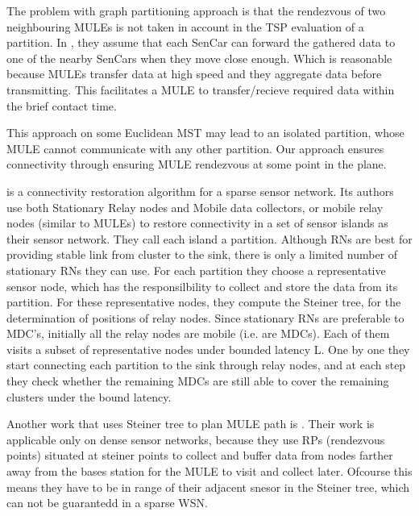 The problem with graph partitioning approach is that the rendezvous of two neighbouring MULEs is not taken in account in the TSP evaluation of a partition. In \cite{sim4}, they assume that each SenCar can forward the gathered data to one of the nearby SenCars when they move close enough. Which is reasonable because MULEs transfer data at high speed and they aggregate data before transmitting. This facilitates a MULE to transfer/recieve required data within the brief contact time.

This approach on some Euclidean MST may lead to an isolated partition, whose MULE cannot communicate with any other partition. Our approach ensures connectivity through ensuring MULE rendezvous at some point in the plane.

\cite{sim3} is a connectivity restoration algorithm for a sparse sensor network. Its authors use both Stationary Relay nodes and Mobile data collectors, or mobile relay nodes (similar to MULEs) to restore connectivity in a set of sensor islands as their sensor network. They call each island a partition. Although RNs are best for providing stable link from cluster to the sink, there is only a limited number of stationary RNs they can use. For each partition they choose a representative sensor node, which has the responsilbility to collect and store the data from its partition. For these representative nodes, they compute the Steiner tree, for the determination of positions of relay nodes. Since stationary RNs are preferable to MDC's, initially all the relay nodes are mobile (i.e. are MDCs). Each of them visits a subset of representative nodes under bounded latency L. One by one they start connecting each partition to the sink through relay nodes, and at each step they check whether the remaining MDCs are still able to cover the remaining clusters under the bound latency.

Another work that uses Steiner tree to plan MULE path is \cite{rendezvous}. Their work is applicable only on dense sensor networks, because they use RPs (rendezvous points) situated at steiner points to collect and buffer data from nodes farther away from the bases station for the MULE to visit and collect later. Ofcourse this means they have to be in range of their adjacent snesor in the Steiner tree, which can not be guarantedd in a sparse WSN.